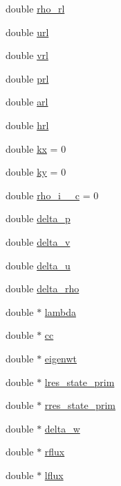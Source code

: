 \begin{DoxyCompactItemize}
\item 
double \hyperlink{classRoe_a72c829cd1d89332456ed4f002143be27}{rho\+\_\+rl}
\item 
double \hyperlink{classRoe_affc96152da540e7b72c1fde648ad8ce5}{url}
\item 
double \hyperlink{classRoe_a993e6170348de395ca50fff9fbf4b64b}{vrl}
\item 
double \hyperlink{classRoe_a45fef8454e2149fda58bcd64ae4a9f58}{prl}
\item 
double \hyperlink{classRoe_a639c7fd0b084bc426d2a0f92cb63dae5}{arl}
\item 
double \hyperlink{classRoe_a94bffa136d267cf6d55ea8a733f0de5d}{hrl}
\item 
double \hyperlink{classRoe_acd00b091fb49655aa37348550daa0723}{kx} = 0
\item 
double \hyperlink{classRoe_a4b23fbf92c73f2ca7e1e5c5f95a53d4f}{ky} = 0
\item 
double \hyperlink{classRoe_ab3c69812a100c79b7f035dcd524766bf}{rho\+\_\+i\+\_\+\_\+c} = 0
\item 
double \hyperlink{classRoe_a02e4884743f77b6b6739fa2dacefd33b}{delta\+\_\+p}
\item 
double \hyperlink{classRoe_a430b1d9011401ad7c5c7ca289f540a6c}{delta\+\_\+v}
\item 
double \hyperlink{classRoe_acfbc516a21100db263165a5af5f5d5e8}{delta\+\_\+u}
\item 
double \hyperlink{classRoe_ae55c922cabd317fc9f102eb81b75ffc6}{delta\+\_\+rho}
\item 
double $\ast$ \hyperlink{classRoe_a1c3867060e716158854f70de4cc06c9d}{lambda}
\item 
double $\ast$ \hyperlink{classRoe_a049920de1e32bbe641d180960b9ad49f}{cc}
\item 
double $\ast$ \hyperlink{classRoe_afa7d0be4970f24fb45116dcddadaa5e7}{eigenwt}
\item 
double $\ast$ \hyperlink{classRoe_a6be6f36272bcbd79babfeb9cc2392ed8}{lres\+\_\+state\+\_\+prim}
\item 
double $\ast$ \hyperlink{classRoe_a5337654ff25037aecb28c9607f8f655c}{rres\+\_\+state\+\_\+prim}
\item 
double $\ast$ \hyperlink{classRoe_ae5412109e368776acd7a87eba071a1ae}{delta\+\_\+w}
\item 
double $\ast$ \hyperlink{classRoe_a6cbeee3ca1cc97dc6ef80ccf2772654b}{rflux}
\item 
double $\ast$ \hyperlink{classRoe_a7fd79cc24015bad9c333fbd587625dd6}{lflux}
\end{DoxyCompactItemize}


